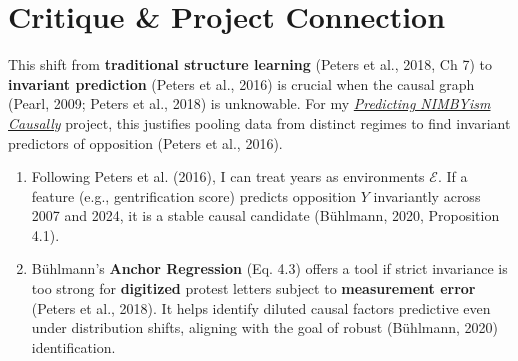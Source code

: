 \documentclass[11pt]{article}
\begin{document}
\section*{Critique \& Project Connection}
This shift from \textbf{traditional structure learning} (Peters et al., 2018, Ch 7) %
to \textbf{invariant prediction} (Peters et al., 2016) %
is crucial when the causal graph (Pearl, 2009; Peters et al., 2018) %
is unknowable.
    For my \href{https://github.com/dhardestylewis/thesis/blob/main/Blei-Invariance_Causality-2026Spring/Project_Proposal.d/2026-02-02/Project_Proposal_Final_V21.pdf}{\textit{Predicting NIMBYism Causally}} project, this justifies pooling data from distinct regimes to find invariant predictors of opposition (Peters et al., 2016).
\begin{enumerate}
    \item Following Peters et al. (2016), I can treat years as environments $\mathcal{E}$.
    If a feature (e.g., gentrification score) predicts opposition $Y$ invariantly across 2007 and 2024, it is a stable causal candidate (Bühlmann, 2020, Proposition 4.1).
    \item Bühlmann's \textbf{Anchor Regression} (Eq. 4.3)
    offers a tool if strict invariance is too strong for \textbf{digitized} protest letters subject to \textbf{measurement error} (Peters et al., 2018).
    It helps identify diluted causal factors
    predictive even under distribution shifts, aligning with the goal of robust (Bühlmann, 2020)
    identification.
\end{enumerate}
\end{document}
